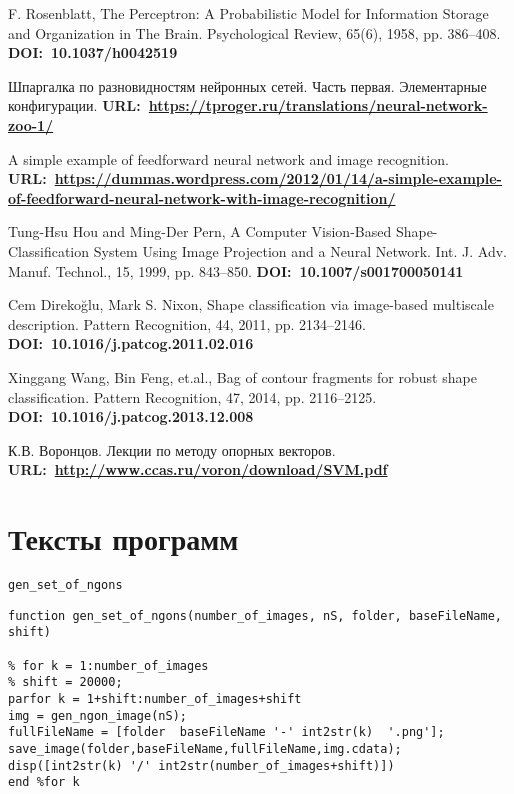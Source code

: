 \documentclass[12pt,a4paper]{article}
\begin{document}
\begin{thebibliography}{99}
 F. Rosenblatt, The Perceptron: A Probabilistic Model for Information Storage and Organization in The Brain. Psychological Review, 65(6), 1958, pp. 386--408. \textbf{DOI:~10.1037/h0042519}

 Шпаргалка по разновидностям нейронных сетей. Часть первая. Элементарные конфигурации. \textbf{URL:~\url{https://tproger.ru/translations/neural-network-zoo-1/}}

 A simple example of feedforward neural network and image recognition.
\textbf{URL:~\url{https://dummas.wordpress.com/2012/01/14/a-simple-example-of-feedforward-neural-network-with-image-recognition/}}

 Tung-Hsu Hou and Ming-Der Pern, A Computer Vision-Based Shape-Classification System Using
Image Projection and a Neural Network.
Int. J. Adv. Manuf. Technol., 15, 1999, pp. 843--850.
\textbf{DOI:~10.1007/s001700050141}

 Cem Direko\u{g}lu, Mark S. Nixon, Shape classification via image-based multiscale description.
Pattern Recognition, 44, 2011, pp. 2134--2146. \textbf{DOI:~10.1016/j.patcog.2011.02.016}

 Xinggang Wang, Bin Feng, et.al., Bag of contour fragments for robust shape classification.
Pattern Recognition, 47, 2014, pp. 2116--2125. \textbf{DOI:~10.1016/j.patcog.2013.12.008}

 К.В. Воронцов. Лекции по методу опорных векторов. \textbf{URL:~\url{http://www.ccas.ru/voron/download/SVM.pdf}}

\end{thebibliography}


\newpage
\appendix 
{}

\section*{Тексты программ}
\verb|gen_set_of_ngons|
\begin{lstlisting}
function gen_set_of_ngons(number_of_images, nS, folder, baseFileName, shift)

% for k = 1:number_of_images
% shift = 20000;
parfor k = 1+shift:number_of_images+shift
img = gen_ngon_image(nS);
fullFileName = [folder  baseFileName '-' int2str(k)  '.png'];
save_image(folder,baseFileName,fullFileName,img.cdata);
disp([int2str(k) '/' int2str(number_of_images+shift)])
end %for k
\end{lstlisting}
\end{document}

